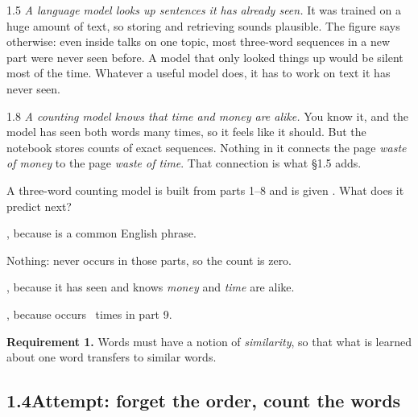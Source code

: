 \begin{wrongidea}{1.5}
\emph{A language model looks up sentences it has already seen.} It was trained on a huge amount of text, so
storing and retrieving sounds plausible. The figure says otherwise: even inside talks on one
topic, most three-word sequences in a new part were never seen before. A model that only looked things up
would be silent most of the time. Whatever a useful model does, it has to work on text it has never seen.
\end{wrongidea}

\begin{wrongidea}{1.8}
\emph{A counting model knows that \emph{time} and \emph{money} are alike.} You know it, and the model has seen
both words many times, so it feels like it should. But the notebook stores counts of exact sequences. Nothing in
it connects the page \emph{waste of money} to the page \emph{waste of time}. That connection is what \S1.5 adds.
\end{wrongidea}

\begin{checkq}
A three-word counting model is built from parts 1--8 and is given . What does it predict next?
\begin{options}
\item {}, because  is a common English phrase.
\item Nothing:  never occurs in those parts, so the count is zero.
\item {}, because it has seen  and knows \emph{money} and \emph{time} are alike.
\item {}, because  occurs \cWasteOfTimeTest\ times in part 9.
\end{options}
\end{checkq}

\begin{sidebar}
\textbf{Requirement 1.} Words must have a notion of \emph{similarity}, so that what is learned about one word
transfers to similar words.
\end{sidebar}


\subsection*{1.4\quad Attempt: forget the order, count the words}

